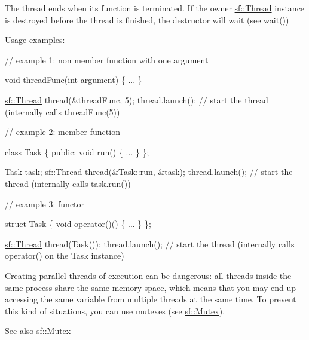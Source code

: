 The thread ends when its function is terminated. If the owner \hyperlink{classsf_1_1_thread}{sf\+::\+Thread} instance is destroyed before the thread is finished, the destructor will wait (see \hyperlink{classsf_1_1_thread_a724b1f94c2d54f84280f2f78bde95fa0}{wait()})

Usage examples\+: 
\begin{DoxyCode}
\textcolor{comment}{// example 1: non member function with one argument}

\textcolor{keywordtype}{void} threadFunc(\textcolor{keywordtype}{int} argument)
\{
    ...
\}

\hyperlink{classsf_1_1_thread}{sf::Thread} thread(&threadFunc, 5);
thread.launch(); \textcolor{comment}{// start the thread (internally calls threadFunc(5))}
\end{DoxyCode}



\begin{DoxyCode}
\textcolor{comment}{// example 2: member function}

\textcolor{keyword}{class }Task
\{
\textcolor{keyword}{public}:
    \textcolor{keywordtype}{void} run()
    \{
        ...
    \}
\};

Task task;
\hyperlink{classsf_1_1_thread}{sf::Thread} thread(&Task::run, &task);
thread.launch(); \textcolor{comment}{// start the thread (internally calls task.run())}
\end{DoxyCode}



\begin{DoxyCode}
\textcolor{comment}{// example 3: functor}

\textcolor{keyword}{struct }Task
\{
    \textcolor{keywordtype}{void} operator()()
    \{
        ...
    \}
\};

\hyperlink{classsf_1_1_thread}{sf::Thread} thread(Task());
thread.launch(); \textcolor{comment}{// start the thread (internally calls operator() on the Task instance)}
\end{DoxyCode}


Creating parallel threads of execution can be dangerous\+: all threads inside the same process share the same memory space, which means that you may end up accessing the same variable from multiple threads at the same time. To prevent this kind of situations, you can use mutexes (see \hyperlink{classsf_1_1_mutex}{sf\+::\+Mutex}).

\begin{DoxySeeAlso}{See also}
\hyperlink{classsf_1_1_mutex}{sf\+::\+Mutex} 
\end{DoxySeeAlso}


